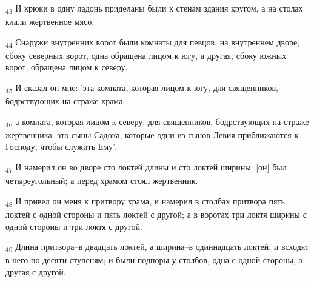 \begin{tcolorbox}
\textsubscript{43} И крюки в одну ладонь приделаны были к стенам здания кругом, а на столах клали жертвенное мясо.
\end{tcolorbox}
\begin{tcolorbox}
\textsubscript{44} Снаружи внутренних ворот были комнаты для певцов; на внутреннем дворе, сбоку северных ворот, одна обращена лицом к югу, а другая, сбоку южных ворот, обращена лицом к северу.
\end{tcolorbox}
\begin{tcolorbox}
\textsubscript{45} И сказал он мне: 'эта комната, которая лицом к югу, для священников, бодрствующих на страже храма;
\end{tcolorbox}
\begin{tcolorbox}
\textsubscript{46} а комната, которая лицом к северу, для священников, бодрствующих на страже жертвенника: это сыны Садока, которые одни из сынов Левия приближаются к Господу, чтобы служить Ему'.
\end{tcolorbox}
\begin{tcolorbox}
\textsubscript{47} И намерил он во дворе сто локтей длины и сто локтей ширины: [он] был четыреугольный; а перед храмом стоял жертвенник.
\end{tcolorbox}
\begin{tcolorbox}
\textsubscript{48} И привел он меня к притвору храма, и намерил в столбах притвора пять локтей с одной стороны и пять локтей с другой; а в воротах три локтя ширины с одной стороны и три локтя с другой.
\end{tcolorbox}
\begin{tcolorbox}
\textsubscript{49} Длина притвора--в двадцать локтей, а ширина--в одиннадцать локтей, и всходят в него по десяти ступеням; и были подпоры у столбов, одна с одной стороны, а другая с другой.
\end{tcolorbox}
